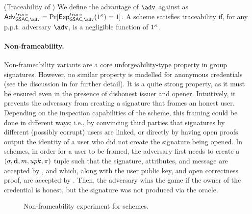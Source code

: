 \begin{definition}{(Traceability of \GSAC)}
  \label{def:trace-gsac}
  We define the advantage \AdvGSACTrace of $\adv$ against \ExpGSACTrace as
  $\AdvGSACTrace=\Pr\lbrack\ExpGSACTrace(1^\secpar)=1\rbrack$.
  A \GSAC scheme satisfies traceability if, for any p.p.t. adversary $\adv$,
  \AdvGSACTrace is a negligible function of $1^\kappa$.
\end{definition}

\paragraph{Non-frameability.} %
Non-frameability variants are a core unforgeability-type property in group
signatures. However, no similar property is modelled for anonymous credentials
(see the discussion in  for further detail). It
is a quite strong
property, as it must be ensured even in the presence of dishonest issuer and
opener. Intuitively, it prevents the adversary from creating a signature that
frames an honest user. Depending on the inspection capabilities of the scheme,
this framing could be done in different ways; i.e., by convincing third parties
that signatures by different (possibly corrupt) users are linked, or directly
by having open proofs output the identity of a user who did not create the
signature being opened.
%
In \GSAC schemes, in order for a user to be framed, the adversary first needs to
create a $(\sigma,\mathbf{d},m,upk,\pi)$ tuple such that the signature,
attributes, and message are accepted by \Verify, and which, along with the user
public key, and open correctness proof, are accepted by \Judge.
Then, the adversary wins the game if the owner of the credential is honest, but
the signature was not produced via the \SIGN oracle.


\begin{figure}[htp!]
  \caption{Non-frameability experiment for \GSAC schemes.}
  \label{fig:exp-gsac-frame}
\end{figure}

